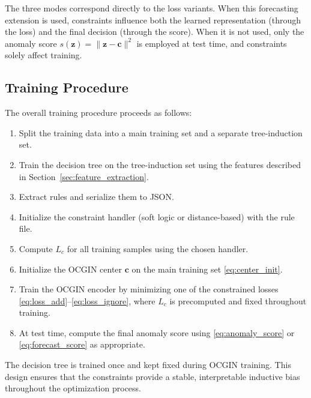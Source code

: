 The three modes correspond directly to the loss variants. When this forecasting extension is used, constraints influence both the learned representation (through the loss) and the final decision (through the score). When it is not used, only the anomaly score $s(\mathbf{z}) = \|\mathbf{z} - \mathbf{c}\|^2$ is employed at test time, and constraints solely affect training.

\subsection{Training Procedure}
\label{sec:training_procedure}

The overall training procedure proceeds as follows:

\begin{enumerate}
  \item Split the training data into a main training set and a separate tree-induction set.
  \item Train the decision tree on the tree-induction set using the features described in Section~\ref{sec:feature_extraction}.
  \item Extract rules and serialize them to JSON.
  \item Initialize the constraint handler (soft logic or distance-based) with the rule file.
  \item Compute $L_c$ for all training samples using the chosen handler.
  \item Initialize the OCGIN center $\mathbf{c}$ on the main training set \eqref{eq:center_init}.
  \item Train the OCGIN encoder by minimizing one of the constrained losses \eqref{eq:loss_add}--\eqref{eq:loss_ignore}, where $L_c$ is precomputed and fixed throughout training.
  \item At test time, compute the final anomaly score using \eqref{eq:anomaly_score} or \eqref{eq:forecast_score} as appropriate.
\end{enumerate}

The decision tree is trained once and kept fixed during OCGIN training. This design ensures that the constraints provide a stable, interpretable inductive bias throughout the optimization process.
